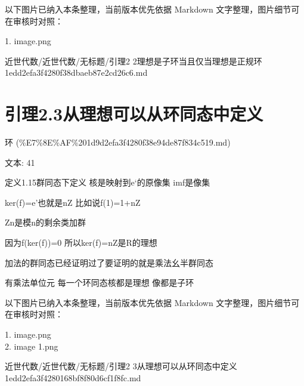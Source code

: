 \begin{note}[关联图片]
以下图片已纳入本条整理，当前版本优先依据 Markdown 文字整理，图片细节可在审核时对照：

1. image.png\\

\end{note}

\begin{note}[来源路径]

近世代数/近世代数/无标题/引理2 2理想是子环当且仅当理想是正规环 1edd2efa3f4280f38dbaeb87e2cd26c6.md

\end{note}

\section*{引理2.3从理想可以从环同态中定义}

\begin{note}[来源上级主题]

环 (\%E7\%8E\%AF\%201d9d2efa3f4280f38e94de87f834c519.md)

\end{note}

\begin{lemma}[引理2.3从理想可以从环同态中定义]

文本: 41

定义1.15群同态下定义 核是映射到e‘的原像集 imf是像集

ker(f)=e’也就是nZ 比如说f(1)=1+nZ

Zn是模n的剩余类加群

因为f(ker(f))=0 所以ker(f)=nZ是R的理想

加法的群同态已经证明过了要证明的就是乘法幺半群同态

有乘法单位元 每一个环同态核都是理想 像都是子环

\end{lemma}

\begin{note}[关联图片]
以下图片已纳入本条整理，当前版本优先依据 Markdown 文字整理，图片细节可在审核时对照：

1. image.png\\
2. image 1.png\\

\end{note}

\begin{note}[来源路径]

近世代数/近世代数/无标题/引理2 3从理想可以从环同态中定义 1edd2efa3f4280168bf8f80d6cf1f8fc.md

\end{note}

